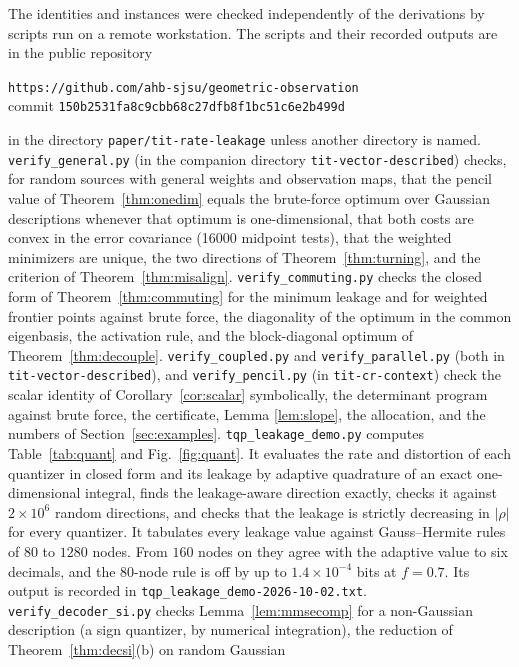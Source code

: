 \documentclass[11pt,onecolumn]{IEEEtran}
\begin{document}
The identities and instances were checked independently of the
derivations by scripts run on a remote workstation. The scripts and
their recorded outputs are in the public repository
\begin{center}
\texttt{https://github.com/ahb-sjsu/geometric-observation}\\
commit \texttt{150b2531fa8c9cbb68c27dfb8f1bc51c6e2b499d}
\end{center}
in the directory \texttt{paper/tit-rate-leakage} unless another directory
is named.
\texttt{verify\_general.py} (in the companion directory
\texttt{tit-vector-described}) checks, for random sources with general
weights and observation maps, that the pencil value of
Theorem~\ref{thm:onedim} equals the brute-force optimum over Gaussian
descriptions whenever that optimum is one-dimensional, that both costs
are convex in the error covariance (16000 midpoint tests), that the
weighted minimizers are unique, the two directions of
Theorem~\ref{thm:turning}, and the criterion of
Theorem~\ref{thm:misalign}. \texttt{verify\_commuting.py} checks the closed form of
Theorem~\ref{thm:commuting} for the minimum leakage and for weighted
frontier points against brute force, the diagonality of the optimum in
the common eigenbasis, the activation rule, and the block-diagonal
optimum of Theorem~\ref{thm:decouple}. \texttt{verify\_coupled.py} and
\texttt{verify\_parallel.py} (both in \texttt{tit-vector-described}), and
\texttt{verify\_pencil.py} (in \texttt{tit-cr-context}) check the
scalar identity of Corollary~\ref{cor:scalar} symbolically, the
determinant program against brute force, the certificate, Lemma
\ref{lem:slope}, the allocation, and the numbers of
Section~\ref{sec:examples}. \texttt{tqp\_leakage\_demo.py} computes
Table~\ref{tab:quant} and Fig.~\ref{fig:quant}. It evaluates the rate
and distortion of each quantizer in closed form and its leakage by
adaptive quadrature of an exact one-dimensional integral, finds the
leakage-aware direction exactly, checks it against $2\times10^6$ random
directions, and checks that the leakage is strictly decreasing in $|\rho|$
for every quantizer. It tabulates every leakage value against
Gauss--Hermite rules of $80$ to $1280$ nodes. From $160$ nodes on they
agree with the adaptive value to six decimals, and the $80$-node rule is
off by up to $1.4\times10^{-4}$ bits at $f=0.7$. Its output is recorded in
\texttt{tqp\_leakage\_demo-2026-10-02.txt}.
\texttt{verify\_decoder\_si.py} checks Lemma~\ref{lem:mmsecomp} for a
non-Gaussian description (a sign quantizer, by numerical integration),
the reduction of Theorem~\ref{thm:decsi}(b) on random Gaussian
\end{document}
